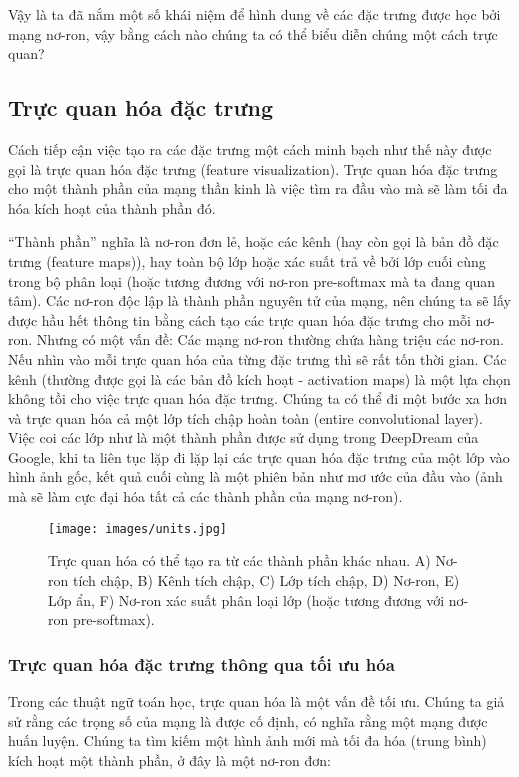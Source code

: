 Vậy là ta đã nắm một số khái niệm để hình dung về các đặc trưng được học bởi mạng nơ-ron, vậy bằng cách nào chúng ta có thể biểu diễn chúng một cách trực quan?

\subsection{Trực quan hóa đặc trưng}

Cách tiếp cận việc tạo ra các đặc trưng một cách minh bạch như thế này được gọi là trực quan hóa đặc trưng (feature visualization). Trực quan hóa đặc trưng cho một thành phần của mạng thần kinh là việc tìm ra đầu vào mà sẽ làm tối đa hóa kích hoạt của thành phần đó.

“Thành phần” nghĩa là nơ-ron đơn lẻ, hoặc các kênh (hay còn gọi là bản đồ đặc trưng (feature maps)), hay toàn bộ lớp hoặc xác suất trả về bởi lớp cuối cùng trong bộ phân loại (hoặc tương đương với nơ-ron pre-softmax mà ta đang quan tâm). Các nơ-ron độc lập là thành phần nguyên tử của mạng, nên chúng ta sẽ lấy được hầu hết thông tin bằng cách tạo các trực quan hóa đặc trưng cho mỗi nơ-ron. Nhưng có một vấn đề: Các mạng nơ-ron thường chứa hàng triệu các nơ-ron. Nếu nhìn vào mỗi trực quan hóa của từng đặc trưng thì sẽ rất tốn thời gian. Các kênh (thường được gọi là các bản đồ kích hoạt - activation maps) là một lựa chọn không tồi cho việc trực quan hóa đặc trưng. Chúng ta có thể đi một bước xa hơn và trực quan hóa cả một lớp tích chập hoàn toàn (entire convolutional layer). Việc coi các lớp như là một thành phần được sử dụng trong DeepDream của Google, khi ta liên tục lặp đi lặp lại các trực quan hóa đặc trưng của một lớp vào hình ảnh gốc, kết quả cuối cùng là một phiên bản như mơ ước của đầu vào (ảnh mà sẽ làm cực đại hóa tất cả các thành phần của mạng nơ-ron).

\begin{figure*}[h!]
	\centering
	\texttt{[image: images/units.jpg]}
	\label{fig:7_2}
	\caption{Trực quan hóa có thể tạo ra từ các thành phần khác nhau. A) Nơ-ron tích chập, B) Kênh tích chập, C) Lớp tích chập, D) Nơ-ron, E) Lớp ẩn, F) Nơ-ron xác suất phân loại lớp (hoặc tương đương với nơ-ron pre-softmax).}
\end{figure*}

\clearpage
\subsubsection{Trực quan hóa đặc trưng thông qua tối ưu hóa}

Trong các thuật ngữ toán học, trực quan hóa là một vấn đề tối ưu. Chúng ta giả sử rằng các trọng số của mạng là được cố định, có nghĩa rằng một mạng được huấn luyện. Chúng ta tìm kiếm một hình ảnh mới mà tối đa hóa (trung bình) kích hoạt một thành phần, ở đây là một nơ-ron đơn:

